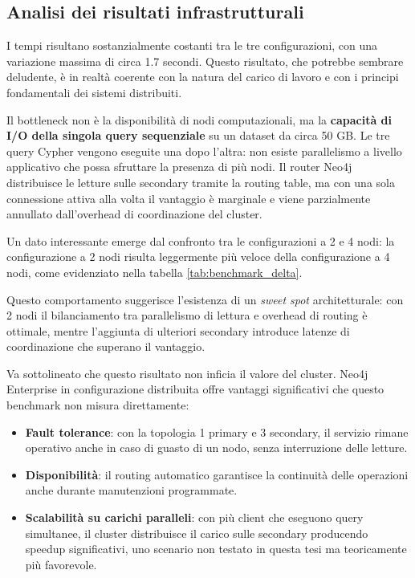 \subsection{Analisi dei risultati infrastrutturali}

I tempi risultano sostanzialmente costanti tra le tre configurazioni, con una variazione massima di circa 1.7 secondi. Questo risultato, che potrebbe sembrare deludente, è in realtà coerente con la natura del carico di lavoro e con i principi fondamentali dei sistemi distribuiti.

Il bottleneck non è la disponibilità di nodi computazionali, ma la \textbf{capacità di I/O della singola query sequenziale} su un dataset da circa 50 GB. Le tre query Cypher vengono eseguite una dopo l'altra: non esiste parallelismo a livello applicativo che possa sfruttare la presenza di più nodi. Il router Neo4j distribuisce le letture sulle secondary tramite la routing table, ma con una sola connessione attiva alla volta il vantaggio è marginale e viene parzialmente annullato dall'overhead di coordinazione del cluster.

Un dato interessante emerge dal confronto tra le configurazioni a 2 e 4 nodi: la configurazione a 2 nodi risulta leggermente più veloce della configurazione a 4 nodi, come evidenziato nella tabella \ref{tab:benchmark_delta}. 

Questo comportamento suggerisce l'esistenza di un \textit{sweet spot} architetturale: con 2 nodi il bilanciamento tra parallelismo di lettura e overhead di routing è ottimale, mentre l'aggiunta di ulteriori secondary introduce latenze di coordinazione che superano il vantaggio.

Va sottolineato che questo risultato non inficia il valore del cluster. Neo4j Enterprise in configurazione distribuita offre vantaggi significativi che questo benchmark non misura direttamente:

\begin{itemize}
  \item \textbf{Fault tolerance}: con la topologia 1 primary e 3 secondary, il servizio rimane operativo anche in caso di guasto di un nodo, senza interruzione delle letture.
  \item \textbf{Disponibilità}: il routing automatico garantisce la continuità delle operazioni anche durante manutenzioni programmate.
  \item \textbf{Scalabilità su carichi paralleli}: con più client che eseguono query simultanee, il cluster distribuisce il carico sulle secondary producendo speedup significativi, uno scenario non testato in questa tesi ma teoricamente più favorevole.
\end{itemize}


